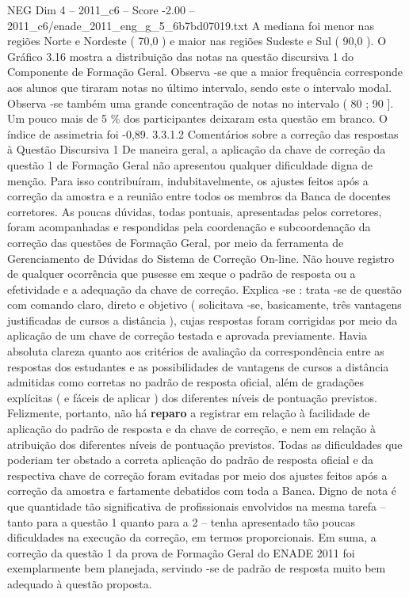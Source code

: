 \begin{textsample}{NEG Dim 4 – 2011\_c6 – Score -2.00 – 2011\_c6/enade\_2011\_eng\_g\_5\_6b7bd07019.txt}
A mediana foi menor nas regiões Norte e Nordeste ( 70,0 ) e maior nas regiões Sudeste e Sul ( 90,0 ).
O Gráfico 3.16 mostra a distribuição das notas na questão discursiva 1 do Componente de Formação Geral.
Observa -se que a maior frequência corresponde aos alunos que tiraram notas no último intervalo, sendo este o intervalo modal.
Observa -se também uma grande concentração de notas no intervalo ( 80 ; 90 ].
Um pouco mais de 5 \% dos participantes deixaram esta questão em branco.
O índice de assimetria foi -0,89. 3.3.1.2 Comentários sobre a correção das respostas à Questão Discursiva 1 De maneira geral, a aplicação da chave de correção da questão 1 de Formação Geral não apresentou qualquer dificuldade digna de menção.
Para isso contribuíram, indubitavelmente, os ajustes feitos após a correção da amostra e a reunião entre todos os membros da Banca de docentes corretores.
As poucas dúvidas, todas pontuais, apresentadas pelos corretores, foram acompanhadas e respondidas pela coordenação e subcoordenação da correção das questões de Formação Geral, por meio da ferramenta de Gerenciamento de Dúvidas do Sistema de Correção On-line.
Não houve registro de qualquer ocorrência que pusesse em xeque o padrão de resposta ou a efetividade e a adequação da chave de correção.
Explica -se : trata -se de questão com comando claro, direto e objetivo ( solicitava -se, basicamente, três vantagens justificadas de cursos a distância ), cujas respostas foram corrigidas por meio da aplicação de um chave de correção testada e aprovada previamente.
Havia absoluta clareza quanto aos critérios de avaliação da correspondência entre as respostas dos estudantes e as possibilidades de vantagens de cursos a distância admitidas como corretas no padrão de resposta oficial, além de gradações explícitas ( e fáceis de aplicar ) dos diferentes níveis de pontuação previstos.
Felizmente, portanto, não há \textbf{reparo} a registrar em relação à facilidade de aplicação do padrão de resposta e da chave de correção, e nem em relação à atribuição dos diferentes níveis de pontuação previstos.
Todas as dificuldades que poderiam ter obstado a correta aplicação do padrão de resposta oficial e da respectiva chave de correção foram evitadas por meio dos ajustes feitos após a correção da amostra e fartamente debatidos com toda a Banca.
Digno de nota é que quantidade tão significativa de profissionais envolvidos na mesma tarefa – tanto para a questão 1 quanto para a 2 – tenha apresentado tão poucas dificuldades na execução da correção, em termos proporcionais.
Em suma, a correção da questão 1 da prova de Formação Geral do ENADE 2011 foi exemplarmente bem planejada, servindo -se de padrão de resposta muito bem adequado à questão proposta.

\end{textsample}
